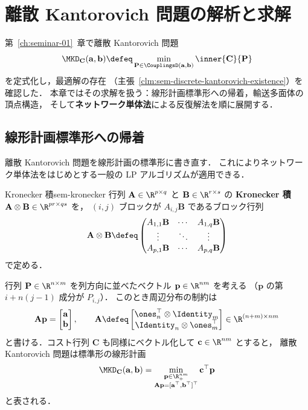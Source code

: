 \chapter{離散 Kantorovich 問題の解析と求解}
\label{ch:seminar-02}

第~\ref{ch:seminar-01}~章で離散 Kantorovich 問題
\[
  \MKD_{\mathbf{C}}(\mathbf{a}, \mathbf{b})
  \defeq \min_{\mathbf{P} \in \CouplingsD(\mathbf{a}, \mathbf{b})}
  \inner{\mathbf{C}}{\mathbf{P}}
\]
を定式化し，最適解の存在
（主張~\ref{clm:sem-discrete-kantorovich-existence}）を確認した．
本章ではその求解を扱う：線形計画標準形への帰着，輸送多面体の頂点構造，
そして\textbf{ネットワーク単体法}による反復解法を順に展開する．

\section{線形計画標準形への帰着}
\label{sec:sem-lp-standard}

離散 Kantorovich 問題を線形計画の標準形に書き直す．
これによりネットワーク単体法をはじめとする一般の LP アルゴリズムが適用できる．

\begin{definition}{Kronecker 積}{sem-kronecker}
  行列 $\mathbf{A} \in \R^{p \times q}$ と $\mathbf{B} \in \R^{r \times s}$ の
  \textbf{Kronecker 積} $\mathbf{A} \otimes \mathbf{B} \in \R^{pr \times qs}$ を，
  $(i,j)$ ブロックが $A_{i,j} \mathbf{B}$ であるブロック行列
  \[
    \mathbf{A} \otimes \mathbf{B} \defeq
    \begin{pmatrix}
      A_{1,1}\mathbf{B} & \cdots & A_{1,q}\mathbf{B} \\
      \vdots & \ddots & \vdots \\
      A_{p,1}\mathbf{B} & \cdots & A_{p,q}\mathbf{B}
    \end{pmatrix}
  \]
  で定める．
\end{definition}

行列 $\mathbf{P} \in \R^{n \times m}$ を列方向に並べたベクトル
$\mathbf{p} \in \R^{nm}$ を考える
（$\mathbf{p}$ の第 $i + n(j-1)$ 成分が $P_{i,j}$）．
このとき周辺分布の制約は
\[
  \mathbf{A}\mathbf{p}
  = \begin{bmatrix} \mathbf{a} \\ \mathbf{b} \end{bmatrix},
  \qquad
  \mathbf{A} \defeq
  \begin{bmatrix}
    \ones_n^\top \otimes \Identity_m \\
    \Identity_n \otimes \ones_m^\top
  \end{bmatrix}
  \in \R^{(n+m) \times nm}
\]
と書ける．コスト行列 $\mathbf{C}$ も同様にベクトル化して
$\mathbf{c} \in \R^{nm}$ とすると，
離散 Kantorovich 問題は標準形の線形計画
\[
  \MKD_{\mathbf{C}}(\mathbf{a}, \mathbf{b})
  = \min_{\substack{\mathbf{p} \in \R_+^{nm} \\
    \mathbf{A}\mathbf{p} = [\mathbf{a}^\top, \mathbf{b}^\top]^\top}}
  \mathbf{c}^\top \mathbf{p}
\]
と表される．

